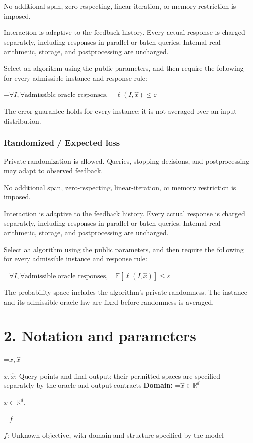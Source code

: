 \documentclass[10pt,a4paper]{article}
\newcommand{\AtlasMath}[1]{\par\begingroup\centering\setbox0=\hbox{$\displaystyle #1$}\ifdim\wd0>1.4\linewidth\typeout{ATLAS WIDE FORMULA: \the\wd0}\fi\ifdim\wd0>\linewidth\resizebox{\linewidth}{!}{\box0}\else\box0\fi\par\endgroup}
\newcommand{\AtlasInlineMath}[1]{\begingroup\setbox0=\hbox{$#1$}\ifdim\wd0>.4\linewidth\endgroup\AtlasMath{#1}\else\endgroup$#1$\fi}
\begin{document}
No additional span, zero-respecting, linear-iteration, or memory restriction is imposed.

Interaction is adaptive to the feedback history. Every actual response is charged separately, including responses in parallel or batch queries. Internal real arithmetic, storage, and postprocessing are uncharged.

Select an algorithm using the public parameters, and then require the following for every admissible instance and response rule:


\AtlasMath{\forall I,\forall\text{admissible oracle responses},\quad\ell(I,\widehat{x})\le\varepsilon}


The error guarantee holds for every instance; it is not averaged over an input distribution.

\subsubsection{Randomized / Expected loss}
Private randomization is allowed. Queries, stopping decisions, and postprocessing may adapt to observed feedback.

No additional span, zero-respecting, linear-iteration, or memory restriction is imposed.

Interaction is adaptive to the feedback history. Every actual response is charged separately, including responses in parallel or batch queries. Internal real arithmetic, storage, and postprocessing are uncharged.

Select an algorithm using the public parameters, and then require the following for every admissible instance and response rule:


\AtlasMath{\forall I,\forall\text{admissible oracle responses},\quad\mathbb{E}[\ell(I,\widehat{x})]\le\varepsilon}


The probability space includes the algorithm's private randomness. The instance and its admissible oracle law are fixed before randomness is averaged.

\section{2. Notation and parameters}
\AtlasInlineMath{x,\widehat{x}}: Query points and final output; their permitted spaces are specified separately by the oracle and output contracts \textbf{Domain:} \AtlasInlineMath{\widehat{x}\in \mathbb{R}^d}.

\AtlasInlineMath{f}: Unknown objective, with domain and structure specified by the model
\end{document}

